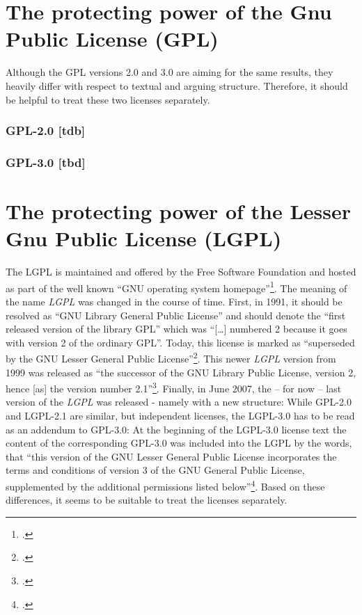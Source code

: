 \section{The protecting power of the Gnu Public License (GPL)}
\label{sec:ProtectingPowerOfGpl}


Although the GPL versions 2.0 and 3.0 are aiming for the same results, they
heavily differ with respect to textual and arguing structure. Therefore, it
should be helpful to treat these two licenses separately.

\subsubsection {GPL-2.0 [tdb]} \label{subsec:ProtectingPowerOfGpl20}

\subsubsection {GPL-3.0 [tbd]}\label{subsec:ProtectingPowerOfLgpl30}

\section{The protecting power of the Lesser Gnu Public License (LGPL)}
\label{sec:ProtectingPowerOfLgpl}

The LGPL is maintained and offered by the Free Software Foundation and hosted as
part of the well known \enquote{GNU operating system
homepage}\footcite[cf.][\nopage wp]{FsfGnuOsLicenses2011a}. The meaning of the
name \emph{LGPL} was changed in the course of time. First, in 1991, it should be
resolved as \enquote{GNU Library General Public License} and should denote the
\enquote{first released version of the library GPL} which was \enquote{[\ldots]
numbered 2 because it goes with version 2 of the ordinary GPL}. Today, this
license is marked as \enquote{superseded by the GNU Lesser General Public
License}\footcite[cf.][\nopage wp]{Lgpl20FsfLicense1991a}. This newer
\emph{LGPL} version from 1999 was released as \enquote{the successor of the GNU
Library Public License, version 2, hence [as] the version number
2.1}\footcite[cf.][\nopage wp]{Lgpl21FsfLicense1999a}. Finally, in June 2007,
the -- for now -- last version of the \emph{LGPL} was released - namely with a
new structure: While GPL-2.0 and LGPL-2.1 are similar, but independent licenses,
the LGPL-3.0 has to be read as an addendum to GPL-3.0: At the beginning of the
LGPL-3.0 license text the content of the corresponding GPL-3.0 was included into
the LGPL by the words, that \enquote{this version of the GNU Lesser General
Public License incorporates the terms and conditions of version 3 of the GNU
General Public License, supplemented by the additional permissions listed
below}\footcite[cf.][\nopage wp]{Lgpl30FsfLicense2007a}. Based on these
differences, it seems to be suitable to treat the licenses separately.

